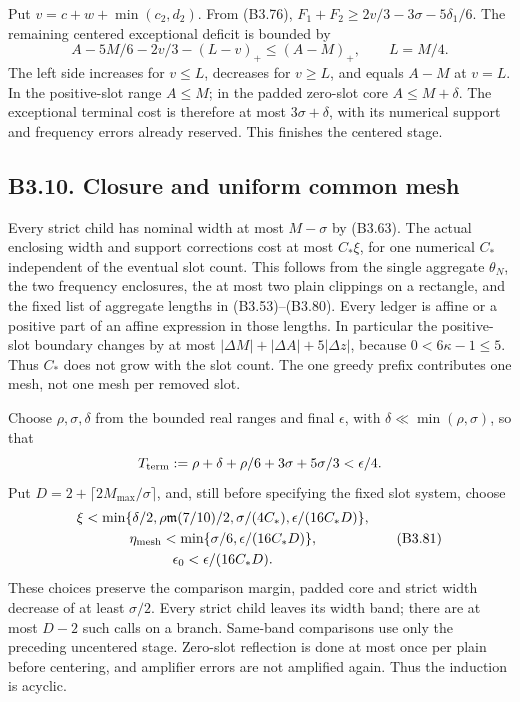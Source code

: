 \documentclass[11pt,a4paper]{article}
\begin{document}
Put \(v=c+w+\min(c_2,\allowbreak{}d_2)\). From (B3.76),
\(F_1+F_2\ge2v/3-3\sigma-5\delta_1/6\). The remaining centered
exceptional deficit is bounded by \[
A-5M/6-2v/3-(L-v)_+\le(A-M)_+,
\qquad L=M/4.
\tag{B3.80}
\] The left side increases for \(v\le L\), decreases for \(v\ge L\), and
equals \(A-M\) at \(v=L\). In the positive-slot range \(A\le M\); in the
padded zero-slot core \(A\le M+\delta\). The exceptional terminal cost
is therefore at most \(3\sigma+\delta\), with its numerical support and
frequency errors already reserved. This finishes the centered stage.

\hypertarget{b3.10.-closure-and-uniform-common-mesh}{%
\subsection{B3.10. Closure and uniform common
mesh}\label{b3.10.-closure-and-uniform-common-mesh}}

Every strict child has nominal width at most \(M-\sigma\) by (B3.63).
The actual enclosing width and support corrections cost at most
\(C_*\xi\), for one numerical \(C_*\) independent of the eventual slot
count. This follows from the single aggregate \(\theta_N\), the two
frequency enclosures, the at most two plain clippings on a rectangle,
and the fixed list of aggregate lengths in (B3.53)--(B3.80). Every
ledger is affine or a positive part of an affine expression in those
lengths. In particular the positive-slot boundary changes by at most
\(|\Delta M|+|\Delta A|+5|\Delta z|\), because \(0<6\kappa-1\le5\). Thus
\(C_*\) does not grow with the slot count. The one greedy prefix
contributes one mesh, not one mesh per removed slot.

Choose \(\rho,\allowbreak{}\sigma,\allowbreak{}\delta\) from the bounded real ranges and final
\(\epsilon\), with \(\delta\ll\min(\rho,\allowbreak{}\sigma)\), so that \[
T_{\rm term}:=\rho+\delta+\rho/6+3\sigma+5\sigma/3<\epsilon/4.
\] Put \(D=2+\lceil2M_{\max}/\sigma\rceil\), and, still before
specifying the fixed slot system, choose \[
\begin{gathered}
\xi<\min\{\delta/2,\rho\mathfrak m(7/10)/2,\sigma/(4C_*),
                   \epsilon/(16C_*D)\},\\
\eta_{\rm mesh}<\min\{\sigma/6,\epsilon/(16C_*D)\},\\
\epsilon_0<\epsilon/(16C_*D).
\end{gathered}
\tag{B3.81}
\] These choices preserve the comparison margin, padded core and strict
width decrease of at least \(\sigma/2\). Every strict child leaves its
width band; there are at most \(D-2\) such calls on a branch. Same-band
comparisons use only the preceding uncentered stage. Zero-slot
reflection is done at most once per plain before centering, and
amplifier errors are not amplified again. Thus the induction is acyclic.
\end{document}
